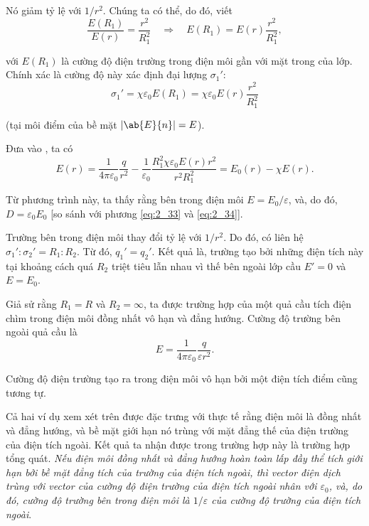 \noindent
Nó giảm tỷ lệ với $1/r^2$. Chúng ta có thể, do đó, viết
\begin{equation*}
    \frac{E(R_1)}{E(r)} = \frac{r^2}{R_1^2}\quad \Rightarrow\quad E(R_1) = E(r) \frac{r^2}{R_1^2},
\end{equation*}

\noindent
với $E(R_1)$ là cường độ điện trường trong điện môi gần với mặt trong của lớp. Chính xác là cường độ này xác định đại lượng $\sigma_1'$:
\begin{equation}\label{eq:2_40}
    \sigma_1' = \chi\varepsilon_0 E(R_1) = \chi\varepsilon_0 E(r) \frac{r^2}{R_1^2}
\end{equation}

\noindent
(tại môi điểm của bề mặt $|\ab{E}{n}|=E$).

Đưa  vào , ta có
\begin{equation*}
    E(r) = \frac{1}{4\pi\varepsilon_0} \frac{q}{r^2} - \frac{1}{\varepsilon_0} \frac{R_1^2 \chi \varepsilon_0 E(r) r^2}{r^2 R_1^2} = E_0(r) - \chi E(r).
\end{equation*}

\noindent
Từ phương trình này, ta thấy rằng bên trong điện môi $E=E_0/\varepsilon$, và, do đó, $D=\varepsilon_0E_0$ [so sánh với phương \eqref{eq:2_33} và \eqref{eq:2_34}].

Trường bên trong điện môi thay đổi tỷ lệ với $1/r^2$. Do đó, có liên hệ $\sigma_1' :\sigma_2' = R_1 : R_2$. Từ đó,  $q_1'=q_2'$. Kết quả là, trường tạo bởi những điện tích này tại khoảng cách quá $R_2$ triệt tiêu lẫn nhau vì thế bên ngoài lớp cầu $E'=0$ và $E=E_0$.

Giả sử rằng $R_1=R$ và $R_2=\infty$, ta được trường hợp của một quả cầu tích điện chìm trong điện môi đồng nhất vô hạn và đẳng hướng. Cường độ trường bên ngoài quả cầu là
\begin{equation}\label{eq:2_41}
    E = \frac{1}{4\pi\varepsilon_0} \frac{q}{\varepsilon r^2}.
\end{equation}

\noindent
Cường độ điện trường tạo ra trong điện môi vô hạn bởi một điện tích điểm cũng tương tự.

Cả hai ví dụ xem xét trên được đặc trưng với thực tế rằng điện môi là đồng nhất và đẳng hướng, và bề mặt giới hạn nó trùng với mặt đẳng thế của điện trường của điện tích ngoài. Kết quả ta nhận được trong trường hợp này là trường hợp tổng quát. \textit{Nếu điện môi đồng nhất và đẳng hướng hoàn toàn lấp đầy thể tích giới hạn bởi bề mặt đẳng tích của trường của điện tích ngoài, thì vector điện dịch trùng với vector của cường độ điện trường của điện tích ngoài nhân với $\varepsilon_0$, và, do đó, cường độ trường bên trong điện môi là $1/\varepsilon$ của cường độ trường của điện tích ngoài}.


